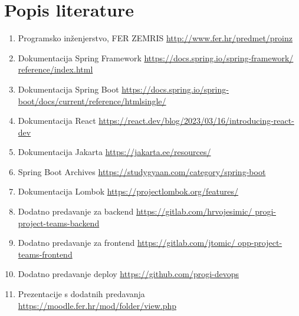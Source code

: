 \chapter*{Popis literature}
	 	
 		
		
		\begin{enumerate}
			
			
			\item  Programsko inženjerstvo, FER ZEMRIS \newline
			 \url{http://www.fer.hr/predmet/proinz}
			\item Dokumentacija Spring Framework \newline
			\url{https://docs.spring.io/spring-framework/  reference/index.html}
			\item Dokumentacija Spring Boot \newline
			\url{https://docs.spring.io/spring-boot/docs/current/reference/htmlsingle/}
			\item Dokumentacija React \newline
			\url{https://react.dev/blog/2023/03/16/introducing-react-dev}
			\item Dokumentacija Jakarta \newline
			\url{https://jakarta.ee/resources/}
			\item Spring Boot Archives \newline
			\url{https://studygyaan.com/category/spring-boot}
			\item Dokumentacija Lombok \newline
			\url{https://projectlombok.org/features/}
			\item Dodatno predavanje za backend \newline
			\url{https://gitlab.com/hrvojesimic/  progi-project-teams-backend}
			\item Dodatno predavanje za frontend \newline
			\url{https://gitlab.com/jtomic/  opp-project-teams-frontend}
			\item Dodatno predavanje deploy \newline
			\url{https://github.com/progi-devops}
			\item Prezentacije s dodatnih predavanja \newline
			\url{https://moodle.fer.hr/mod/folder/view.php}
			
			
		\end{enumerate}
		
		 